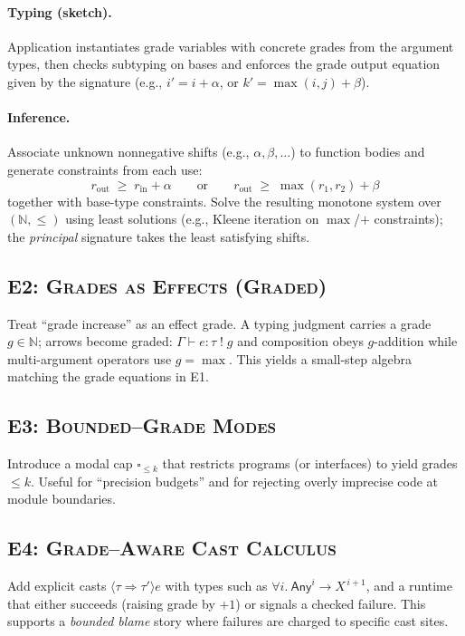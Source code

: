 \paragraph{Typing (sketch).}
Application instantiates grade variables with concrete grades from the argument types,
then checks subtyping on bases and enforces the grade output equation given by the signature
(e.g., $i'\!=\!i{+}\alpha$, or $k'\!=\!\max(i,j){+}\beta$).

\paragraph{Inference.}
Associate unknown nonnegative shifts (e.g., $\alpha,\beta,\dots$) to function bodies and generate constraints from each use:
\[
r_{\text{out}} \;\ge\; r_{\text{in}} + \alpha
\qquad\text{or}\qquad
r_{\text{out}} \;\ge\; \max(r_1,r_2) + \beta
\]
together with base-type constraints.
Solve the resulting monotone system over $(\mathbb{N},\le)$ using least solutions
(e.g., Kleene iteration on $\max$/$+$ constraints); the \emph{principal} signature takes the least satisfying shifts.

\medskip

\subsection{\textsc{E2: Grades as Effects (Graded)}}
Treat “grade increase” as an effect grade.
A typing judgment carries a grade $g\in\mathbb{N}$; arrows become graded:
\(
\Gamma \vdash e : \tau \;!\; g
\)
and composition obeys $g$-addition while multi-argument operators use $g=\max$.
This yields a small-step algebra matching the grade equations in \textsc{E1}.

\subsection{\textsc{E3: Bounded–Grade Modes}}
Introduce a modal cap $\square_{\le k}$ that restricts programs (or interfaces) to yield grades $\le k$.
Useful for “precision budgets” and for rejecting overly imprecise code at module boundaries.

\subsection{\textsc{E4: Grade–Aware Cast Calculus}}
Add explicit casts $\langle \tau \Rightarrow \tau'\rangle e$ with types such as
$\forall i.\ \textsf{Any}^{i} \to X^{\,i+1}$,
and a runtime that either succeeds (raising grade by $+1$) or signals a checked failure.
This supports a \emph{bounded blame} story where failures are charged to specific cast sites.

